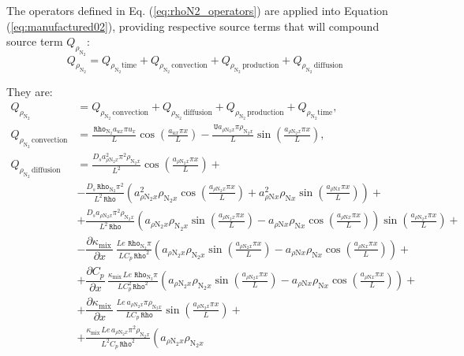 \documentclass[10pt]{article}
\newcommand{\diff}[2] {\dfrac{\partial #1 }{\partial #2}}
\newcommand{\Rho}{\,\mathtt{Rho}}
\newcommand{\U}{\,\mathtt{U}}
\newcommand{\N}{\text{N}}
\newcommand{\mix}{\text{mix}\,}
\newcommand{\DKappaDx}{\diff{\kappa_{\mix}}{x}\,}
\newcommand{\DCpDx}{\diff{C_p}{x}\,}
\newcommand{\convection}{\,\text{convection}}
\newcommand{\production}{\,\text{production}}
\newcommand{\diffusion}{\,\text{diffusion}}
\begin{document}
The operators defined in Eq. (\ref{eq:rhoN2_operators}) are applied into Equation  (\ref{eq:manufactured02}), providing respective
source terms that will compound source term $Q_{\rho_{\N_2} }$:
\begin{equation*}
Q_{\rho_{\N_2} } = Q_{\rho_{\N_2} \text{time}}+Q_{\rho_{\N_2} \convection}+Q_{\rho_{\N_2} \production}+Q_{\rho_{\N_2} \diffusion}
\end{equation*}

They are:
\begin{equation*}
\begin{split}
Q_{\rho_{\N_2}} &= Q_{\rho_{\N_2} \convection} + Q_{\rho_{\N_2} \diffusion} + Q_{\rho_{\N_2} \production} + Q_{\rho_{\N_2}
\text{time}},\\
%
Q_{\rho_{\N_2}\convection} &= \frac{\Rho_{\N_2} a_{ux} \pi u_{x} }{L}\cos\left(\frac{a_{ux} \pi x}{L}\right) - \frac{\U a_{ \rho
\N_2 x} \pi \rho_{\N_2 x}}{L} \sin\left(\frac{a_{ \rho \N_2 x} \pi x}{L}\right),\\
%
 Q_{\rho_{\N_2}\diffusion} &= \frac{D_s a_{ \rho \N_2 x}^{2} \pi^{2} \rho_{\N_2 x} }{L^{2}} \cos\left(\frac{a_{ \rho \N_2 x} \pi
x}{L}\right)+\\
%
&- \frac{D_s \Rho_{\N_2} \pi^{2} }{L^{2} \Rho}\left(a_{ \rho \N_2 x}^{2} \rho_{\N_2 x} \cos\left(\frac{a_{ \rho \N_2 x} \pi
x}{L}\right) + a_{ \rho \N x}^{2} \rho_{\N x} \sin\left(\frac{a_{ \rho \N x} \pi x}{L}\right)\right) +\\ 
%
& + \frac{D_s a_{ \rho \N_2 x} \pi^{2} \rho_{\N_2 x} }{L^{2} \Rho} \left(a_{ \rho \N_2 x} \rho_{\N_2 x} \sin\left(\frac{a_{ \rho
\N_2 x} \pi x}{L}\right) - a_{ \rho \N x} \rho_{\N x} \cos\left(\frac{a_{ \rho \N x} \pi x}{L}\right)\right) \sin\left(\frac{a_{
\rho \N_2 x} \pi x}{L}\right)+\\ 
%
& - \DKappaDx \frac{ Le \, \Rho_{\N_2} \pi }{L C_p\Rho^{2}}\left(a_{ \rho \N_2 x} \rho_{\N_2 x} \sin\left(\frac{a_{ \rho \N_2 x}
\pi x}{L}\right) - a_{ \rho \N x} \rho_{\N x} \cos\left(\frac{a_{ \rho \N x} \pi x}{L}\right)\right) +\\
%
& + \DCpDx \frac{ \kappa_{\mix} Le \, \Rho_{\N_2} \pi }{L C_p^{2} \Rho^{2}}\left(a_{ \rho \N_2 x} \rho_{\N_2 x}
\sin\left(\frac{a_{ \rho \N_2 x} \pi x}{L}\right) - a_{ \rho \N x} \rho_{\N x} \cos\left(\frac{a_{ \rho \N x} \pi
x}{L}\right)\right) +\\
%
& + \DKappaDx \frac{ Le \, a_{ \rho \N_2 x} \pi \rho_{\N_2 x} }{L C_p\Rho}\sin\left(\frac{a_{ \rho \N_2 x} \pi x}{L}\right) +\\
%
&+ \frac{\kappa_{\mix} Le \, a_{ \rho \N_2 x} \pi^{2} \rho_{\N_2 x} }{L^{2} C_p \Rho^{2}}\left(a_{ \rho \N_2 x} \rho_{\N_2 x}

\end{split}
\end{equation*}
\end{document}
